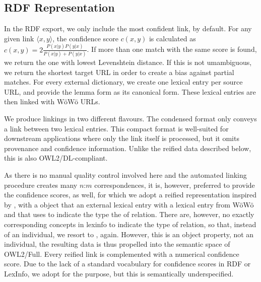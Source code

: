 \subsection{RDF Representation}

In the RDF export, we only include the most confident link, by default. For any given link $\langle x,y\rangle$, the confidence score $c(x,y)$ is calculated as $c(x,y)=2 \frac{P(x|y) P(y|x)}{P(x|y) + P(y|x)}$. If more than one match with the same score is found, we return the one with lowest Levenshtein distance. If this is not umambiguous, we return the shortest target URL in order to create a bias against partial matches. For every external dictionary, we create one lexical entry per source URL, and provide the lemma form as its canonical form. These lexical entries are then linked with WöWö URLs.

We produce linkings in two different flavours. The condensed format only conveys a  link between two lexical entries. %
This compact format is well-suited for downstream applications where only the link itself is processed, but it omits provenance and confidence information. Unlike the reified data described below, this is also OWL2/DL-compliant. 

As there is no manual quality control involved here and the automated linking procedure creates many $n$:$m$ correspondences, it is, however, preferred to provide the confidence scores, as well, for which we adopt a reified representation inspired by \citet{gillis2023refinement}, with a  object that  an external lexical entry with a lexical entry from WöWö and that uses  to indicate the type the of relation. There are, however, no exactly corresponding concepts in lexinfo to indicate the type of relation, so that, instead of an individual, we resort to , again. However, this is an object property, not an individual, the resulting data is thus propelled into the semantic space of OWL2/Full.
Every reified link is complemented with a numerical confidence score. Due to the lack of a standard vocabulary for confidence scores in RDF or LexInfo, we adopt  for the purpose, but this is semantically underspecified. %

